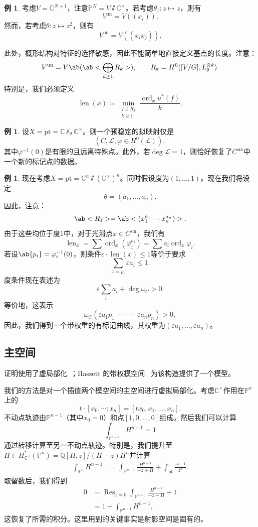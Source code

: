 \documentclass{amsart}
\theoremstyle{definition}
\newtheorem{exm}[thm]{例}
\theoremstyle{remark}
\theoremstyle{plain}
\theoremstyle{definition}
\theoremstyle{remark}
\newcommand{\C}{\mathbb{C}}
\newcommand{\Q}{\mathbb{Q}}
\renewcommand{\P}{\mathbb{P}}
\newcommand{\ep}{\varepsilon}
\newcommand{\mc}[1]{\mathcal{#1}}
\newcommand{\mr}[1]{\mathrm{#1}}
\newcommand{\on}[1]{\operatorname{#1}}
\newcommand{\1}{\mathbf{1}}
\newcommand{\2}{\mathbf{2}}
\newcommand{\3}{\mathbf{3}}
\begin{document}
\begin{exm}
考虑\(V = \C^{N+1}\)，注意\(\P^N = V \sslash \C^{\times}\)。若考虑\(\theta_1 \colon z \mapsto z\)，则有
    \[ V^{\on{un}} = V((x_i)). \]
然而，若考虑\(\theta \colon z \mapsto z^2\)，则有
    \[ V^{\on{un}} = V((x_i x_j)). \]
\end{exm}

此处，概形结构对特征的选择敏感，因此不能简单地直接定义基点的长度。注意：
\[ V^{\on{un}} = V\ab(\ab< \bigoplus_{k \geq 1} R_k>), \qquad R_k = H^0([V/G], L_{\theta}^{\otimes k}). \]
特别是，我们必须定义
\[ \on{len}(x) \coloneqq \min_{\substack{f \in R_k \\ k \geq 1}} \frac{\on{ord}_x u^*(f)}{k}. \]

\begin{exm}
设\(X = \mr{pt} = \C \sslash_{\theta} \C^{\times}\)。则一个预稳定的拟映射仅是
    \[ (C, \mc{L}, \varphi \in H^0(\mc{L})), \]
其中\(\varphi^{-1}(0)\)是有限的且远离特殊点。此外，若\(\deg \mc{L} = 1\)，则恰好恢复了\(C^{\mr{sm}}\)中一个新的标记点的数据。
\end{exm}

\begin{exm}
现在考虑\(X = \mr{pt} = \C^n \sslash (\C^{\times})^n\)。同时假设度为\((1, \ldots, 1)\)。现在我们将设定
    \[ \theta = (a_1, \ldots, a_n). \]
因此，注意：
    \[ \ab<R_1> = \ab<(x_1^{a_1} \cdots x_n^{a_n})>. \]
由于这些均位于度\(1\)中，对于光滑点\(x \in C^{\mr{sm}}\)，我们有
    \[ \on{len}_x = \sum \on{ord}_x (\varphi_i^{a_i}) = \sum a_i \on{ord}_x \varphi_i. \]
若设\(\ab\{p_i\} = \varphi_i^{-1}(0)\)，则条件\(\ep \cdot \on{len}(x) \leq 1\)等价于要求
    \[ \sum_{x = p_i} \ep a_i \leq 1. \]
度条件现在表述为
    \[ \ep \sum_i a_i + \deg \omega_C > 0. \]
等价地，这表示
    \[ \omega_C(\ep a_1 p_1 + \cdots + \ep a_n p_n) > 0, \]
因此，我们得到一个带权重的有标记曲线，其权重为\((\ep a_1, \ldots, \ep a_n)\)。
\end{exm}

\subsection{主空间}%
\label{sub:Master space}

证明使用了虚局部化~\cite{GP1999}；Hassett 的带权模空间~\cite{Hassett2003} 为该构造提供了一个模型。

我们的方法是对一个插值两个模空间的主空间进行虚拟局部化。考虑\(\C^{\times}\)作用在\(\P^n\)上的
\[ t \cdot [x_0 : \cdots : x_n] = [t x_0, x_1, \ldots, x_n]. \]
不动点轨迹由\(\P^{n-1}\)（其中\(x_0 = 0\)）和点\([1, 0, \ldots, 0]\)组成。然后我们可以计算
\[ \int_{\P^{n-1}} H^{n-1} = 1 \]
通过转移计算至另一不动点轨迹。特别是，我们提升至\(H \in H_{\C^{\times}}^* (\P^n) = \Q[H,z] / (H-z)H^n\)并计算
\begin{align*}
    \int_{\P^n} H^{n-1} &= \int_{\P^{n-1}} \frac{H^{n-1}}{-z+H} + \int_{\mr{pt}} \frac{z^{n-1}}{z^n}.
\end{align*}
取留数后，我们得到
\begin{align*}
    0 &= \on{Res}_{z = 0}\int_{\P^{n-1}} \frac{H^{n-1}}{-z+H} + 1 \\
    &= 1 - \int_{\P^{n-1}}H^{n-1},
\end{align*}
这恢复了所需的积分。这里用到的关键事实是射影空间是固有的。
\end{document}
